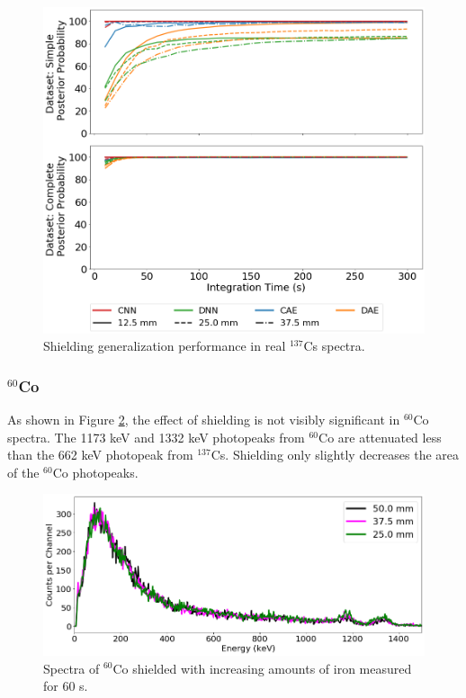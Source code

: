 \begin{figure}[H]
	\centering
	\includegraphics[width=0.8\linewidth]{images/iron_cs137}
	\caption{Shielding generalization performance in real $^{137}$Cs spectra.}
	\label{fig:iron_cs137}
\end{figure}




\subsubsection{$^{60}$Co}

As shown in Figure \ref{fig:shielded_co60}, the effect of shielding is not visibly significant in $^{60}$Co spectra. The 1173 keV and 1332 keV photopeaks from $^{60}$Co are attenuated less than the 662 keV photopeak from $^{137}$Cs. Shielding only slightly decreases the area of the $^{60}$Co photopeaks.

\begin{figure}[H]
	\centering
	\includegraphics[width=0.8\linewidth]{images/shielded_co60}	\caption{Spectra of $^{60}$Co shielded with increasing amounts of iron measured for 60 s.}
	\label{fig:shielded_co60}
\end{figure}

